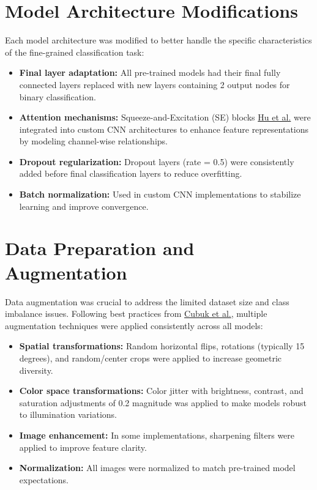 \documentclass[a4paper,12pt]{article}
\begin{document}
\section{Model Architecture Modifications}

Each model architecture was modified to better handle the specific characteristics of the fine-grained classification task:

\begin{itemize}
    \item \textbf{Final layer adaptation:} All pre-trained models had their final fully connected layers replaced with new layers containing 2 output nodes for binary classification.
    \item \textbf{Attention mechanisms:} Squeeze-and-Excitation (SE) blocks \href{https://arxiv.org/abs/1709.01507}{Hu et al.} were integrated into custom CNN architectures to enhance feature representations by modeling channel-wise relationships.
    \item \textbf{Dropout regularization:} Dropout layers (rate = 0.5) were consistently added before final classification layers to reduce overfitting.
    \item \textbf{Batch normalization:} Used in custom CNN implementations to stabilize learning and improve convergence.
\end{itemize}

\section{Data Preparation and Augmentation}

Data augmentation was crucial to address the limited dataset size and class imbalance issues. Following best practices from \href{https://arxiv.org/abs/1712.04621}{Cubuk et al.}, multiple augmentation techniques were applied consistently across all models:

\begin{itemize}
    \item \textbf{Spatial transformations:} Random horizontal flips, rotations (typically 15 degrees), and random/center crops were applied to increase geometric diversity.
    \item \textbf{Color space transformations:} Color jitter with brightness, contrast, and saturation adjustments of 0.2 magnitude was applied to make models robust to illumination variations.
    \item \textbf{Image enhancement:} In some implementations, sharpening filters were applied to improve feature clarity.
    \item \textbf{Normalization:} All images were normalized to match pre-trained model expectations.
\end{itemize}
\end{document}
